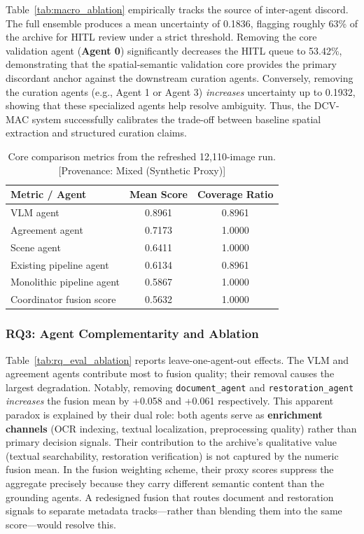 \documentclass[12pt,onecolumn,a4paper]{IEEEtran}
\begin{document}
Table~\ref{tab:macro_ablation} empirically tracks the source of inter-agent discord. The full ensemble produces a mean uncertainty of 0.1836, flagging roughly 63\% of the archive for HITL review under a strict threshold. Removing the core validation agent (\textbf{Agent 0}) significantly decreases the HITL queue to 53.42\%, demonstrating that the spatial-semantic validation core provides the primary discordant anchor against the downstream curation agents. Conversely, removing the curation agents (e.g., Agent 1 or Agent 3) \textit{increases} uncertainty up to 0.1932, showing that these specialized agents help resolve ambiguity. Thus, the DCV-MAC system successfully calibrates the trade-off between baseline spatial extraction and structured curation claims.

\begin{table}[!htbp]
\centering
\caption{Core comparison metrics from the refreshed 12,110-image run. [Provenance: Mixed (Synthetic Proxy)]}
\label{tab:rq_eval_core}
\begin{tabular}{lcc}
\toprule
Metric / Agent & Mean Score & Coverage Ratio \\
\midrule
VLM agent & 0.8961 & 0.8961 \\
Agreement agent & 0.7173 & 1.0000 \\
Scene agent & 0.6411 & 1.0000 \\
Existing pipeline agent & 0.6134 & 0.8961 \\
Monolithic pipeline agent & 0.5867 & 1.0000 \\
Coordinator fusion score & 0.5632 & 1.0000 \\
\bottomrule
\end{tabular}
\end{table}

\subsubsection{RQ3: Agent Complementarity and Ablation}
Table~\ref{tab:rq_eval_ablation} reports leave-one-agent-out effects. The VLM and agreement agents contribute most to fusion quality; their removal causes the largest degradation. Notably, removing \texttt{document\_agent} and \texttt{restoration\_agent} \textit{increases} the fusion mean by +0.058 and +0.061 respectively. This apparent paradox is explained by their dual role: both agents serve as \textbf{enrichment channels} (OCR indexing, textual localization, preprocessing quality) rather than primary decision signals. Their contribution to the archive's qualitative value (textual searchability, restoration verification) is not captured by the numeric fusion mean. In the fusion weighting scheme, their proxy scores suppress the aggregate precisely because they carry different semantic content than the grounding agents. A redesigned fusion that routes document and restoration signals to separate metadata tracks---rather than blending them into the same score---would resolve this.
\end{document}
